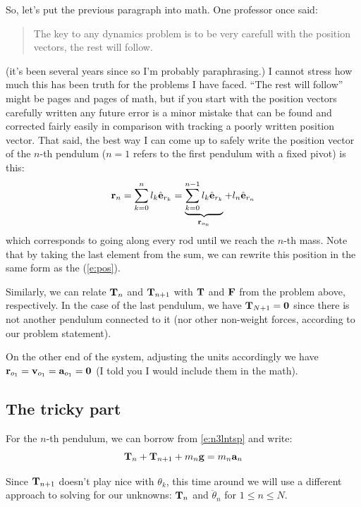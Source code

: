 \documentclass{article}
\begin{document}
So, let's put the previous paragraph into math. One professor once said: 
\begin{quote}
  The key to any dynamics problem is to be very carefull with the position vectors, the rest will follow.
\end{quote}
(it's been several years since so I'm probably paraphrasing.) I cannot stress how much this has been truth for the problems I have faced. ``The rest will follow'' might be pages and pages of math, but if you start with the position vectors carefully written any future error is a minor mistake that can be found and corrected fairly easily in comparison with tracking a poorly written position vector. That said, the best way I can come up to safely write the position vector of the $n$-th pendulum ($n=1$ refers to the first pendulum with a fixed pivot) is this:
\begin{equation}
  \mathbf{r}_n=\sum_{k=0}^{n}l_k\hat{\mathbf{e}}_{r_{k}}=\underbrace{\sum_{k=0}^{n-1}l_k\hat{\mathbf{e}}_{r_{k}}}_{\mathbf{r}_{o_{n}}}+l_n\hat{\mathbf{e}}_{r_{n}}
\end{equation}
which corresponds to going along every rod until we reach the $n$-th mass. Note that by taking the last element from the sum, we can rewrite this position in the same form as the \ntsp (\cref{e:pos}).

Similarly, we can relate $\mathbf{T}_{n}$ and $\mathbf{T}_{n+1}$ with $\mathbf{T}$ and $\mathbf{F}$ from the \ntsp problem above, respectively. In the case of the last pendulum, we have $\mathbf{T}_{N+1}=\mathbf{0}$ since there is not another pendulum connected to it (nor other non-weight forces, according to our problem statement).

On the other end of the system, adjusting the units accordingly we have $\mathbf{r}_{o_{1}}=\mathbf{v}_{o_{1}}=\mathbf{a}_{o_{1}}=\mathbf{0}$ (I told you I would include them in the math).

\subsection{The tricky part}
For the $n$-th pendulum, we can borrow from \cref{e:n3lntsp} and write:
\begin{equation} 
 \mathbf{T}_{n}+\mathbf{T}_{n+1}+m_{n}\mathbf{g}=m_{n}\mathbf{a}_{n} 
\end{equation}

Since $\mathbf{T}_{n+1}$ doesn't play nice with $\theta_k$, this time around we will use a different approach to solving for our unknowns: $\mathbf{T}_{n}$ and $\ddot{\theta}_n$ for $1\le n\le N$.
\end{document}
